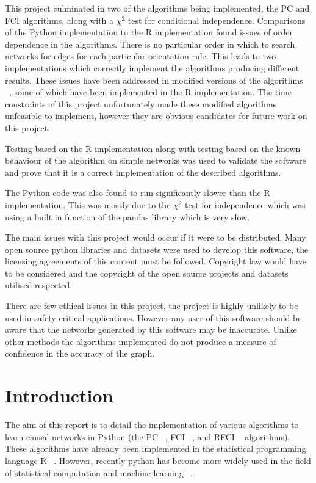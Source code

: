 \documentclass{UoYCSproject}
\begin{document}
\begin{summary}
	This project culminated in two of the algorithms being implemented, the PC and FCI algorithms, along with a $\chi^2$ test for conditional independence. Comparisons of the Python implementation to the R implementation found issues of order dependence in the algorithms. There is no particular order in which to search networks for edges for each particular orientation rule. This leads to two implementations which correctly implement the algorithms producing different results. These issues have been addressed in modified versions of the algorithms ~\parencite{colombo2014order}, some of which have been implemented in the R implementation. The time constraints of this project unfortunately made these modified algorithms unfeasible to implement, however they are obvious candidates for future work on this project.
	
	Testing based on the R implementation along with testing based on the known behaviour of the algorithm on simple networks was used to validate the software and prove that it is a correct implementation of the described algorithms.
	
	The Python code was also found to run significantly slower than the R implementation. This was mostly due to the $\chi^2$ test for independence which was using a built in function of the pandas library which is very slow.
	
	The main issues with this project would occur if it were to be distributed. Many open source python libraries and datasets were used to develop this software, the licensing agreements of this content must be followed. Copyright law would have to be considered and the copyright of the open source projects and datasets utilised respected.
	
	There are few ethical issues in this project, the project is highly unlikely to be used in safety critical applications. However any user of this software should be aware that the networks generated by this software may be inaccurate. Unlike other methods the algorithms implemented do not produce a measure of confidence in the accuracy of the graph.
	
	
\end{summary}
\chapter{Introduction}
The aim of this report is to detail the implementation of various algorithms to learn causal networks in Python (the PC ~\parencite{spirtes1991algorithm}, FCI ~\parencite{colombo2012learning}, and RFCI ~\parencite{colombo2012learning} algorithms). These algorithms have already been implemented in the statistical programming language R ~\parencite{kalisch_hauser_maechler}. However, recently python has become more widely used in the field of statistical computation and machine learning ~\parencite{piatetsky}.
\end{document}
